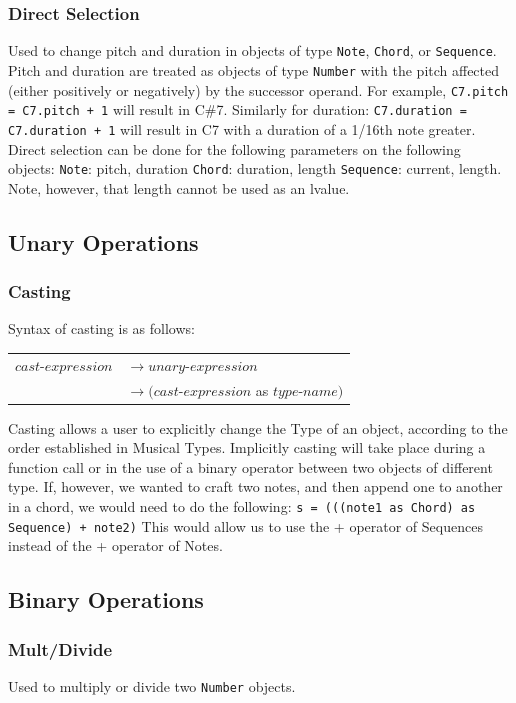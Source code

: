 \documentclass[12pt,A4]{book}
\begin{document}
\subsubsection{Direct Selection}
Used to change pitch and duration in objects of type \verb|Note|, \verb|Chord|, or \verb|Sequence|. Pitch and duration are treated as objects of type  \verb|Number| with the pitch affected (either positively or negatively) by the successor operand. For example, \verb|C7.pitch = C7.pitch + 1| will result in C\#7.
Similarly for duration: \verb|C7.duration = C7.duration + 1| will result in C7 with a duration of a 1/16th note greater.
Direct selection can be done for the following parameters on the following objects:
\verb|Note|: pitch, duration
\verb|Chord|: duration, length
\verb|Sequence|: current, length.  
Note, however, that length cannot be used as an lvalue.

\subsection{Unary Operations}
\subsubsection{Casting}
Syntax of casting is as follows:

\begin{tabular}{l l}
$cast\mbox{-}expression$  & $\rightarrow unary\mbox{-}expression$ \\
& $\rightarrow (cast\mbox{-}expression$ as $type\mbox{-}name)$ 
\end{tabular}

Casting allows a user to explicitly change the Type of an object, according to the order established in Musical Types. Implicitly casting will take place during a function call or in the use of a binary operator between two objects of different type. If, however, we wanted to craft two notes, and then append one to another in a chord, we would need to do the following:
\verb|s = (((note1 as Chord) as Sequence) + note2)|
This would allow us to use the + operator of Sequences instead of the + operator of Notes.
\subsection{Binary Operations}

\subsubsection{Mult/Divide}
Used to multiply or divide two \verb|Number| objects.
\end{document}
